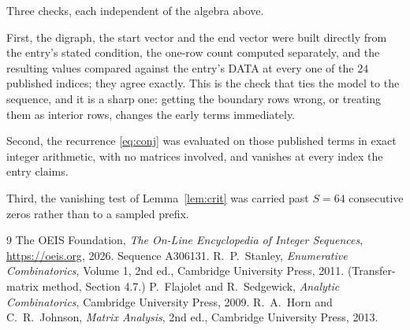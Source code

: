 \documentclass[11pt,a4paper]{article}
\theoremstyle{plain}
\theoremstyle{definition}
\begin{document}
Three checks, each independent of the algebra above.

First, the digraph, the start vector and the end vector were built directly from the
entry's stated condition, the one-row count computed separately, and the resulting values
compared against the entry's DATA at every one of the $24$ published indices; they
agree exactly. This is the check that ties the model to the sequence, and it is a sharp one:
getting the boundary rows wrong, or treating them as interior rows, changes the early terms
immediately.

Second, the recurrence \eqref{eq:conj} was evaluated on those published terms in exact
integer arithmetic, with no matrices involved, and vanishes at every index the entry claims.

Third, the vanishing test of Lemma~\ref{lem:crit} was carried past $S=64$ consecutive
zeros rather than to a sampled prefix.

\begin{thebibliography}{9}
 The OEIS Foundation, \emph{The On-Line Encyclopedia of Integer
Sequences}, \url{https://oeis.org}, 2026. Sequence A306131.
 R.~P.~Stanley, \emph{Enumerative Combinatorics}, Volume 1, 2nd ed.,
Cambridge University Press, 2011. (Transfer-matrix method, Section 4.7.)
 P.~Flajolet and R.~Sedgewick, \emph{Analytic Combinatorics}, Cambridge
University Press, 2009.
 R.~A.~Horn and C.~R.~Johnson, \emph{Matrix Analysis}, 2nd ed., Cambridge
University Press, 2013.
\end{thebibliography}
\end{document}
